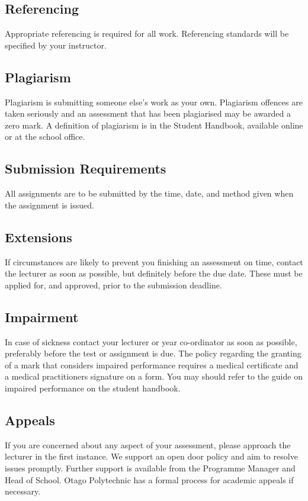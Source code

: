 \documentclass{article}
\begin{document}
\subsection*{Referencing}
Appropriate referencing is required for all work.  Referencing standards will be specified by your instructor.

\subsection*{Plagiarism}
Plagiarism is submitting someone else's work as your own.  Plagiarism offences are taken seriously and an
assessment that has been plagiarised may be awarded a zero mark.  A definition of plagiarism is in the Student Handbook,
available online or at the school office.

\subsection*{Submission Requirements}
All assignments are to be submitted by the time, date, and method given when the assignment is issued.

\subsection*{Extensions}
If circumstances are likely to prevent you finishing an assessment on time, contact the lecturer as soon 
as possible, but definitely before the due date.  These must be applied for, and approved, prior to the submission deadline.

\subsection*{Impairment}
In case of sickness contact your lecturer or year co-ordinator as soon as possible, preferably before the test or
assignment is due.  The policy regarding the granting of a mark that considers impaired performance requires a medical
certificate and a medical practitioners signature on a form. You may should refer to the guide on impaired performance
on the student handbook.

\subsection*{Appeals}
If you are concerned about any aspect of your assessment, please approach the lecturer in the first instance.  We support
an open door policy and aim to resolve issues promptly.  Further support is available from the Programme
Manager and Head of School. Otago Polytechnic has a formal process for academic appeals if necessary.
\end{document}
